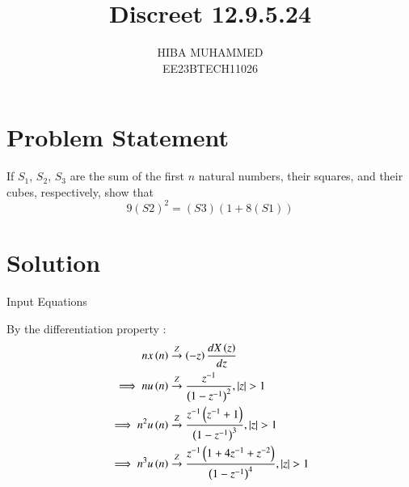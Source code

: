 \documentclass[journal,12pt,onecolumn]{IEEEtran}
\newcommand{\system}[1]{\stackrel{#1}{\rightarrow}}
\theoremstyle{remark}
\begin{document}
\let\vec\mathbf



\title{Discreet 12.9.5.24}
\author{HIBA MUHAMMED\\
        EE23BTECH11026}
\maketitle

\section*{Problem Statement}
If \(S_1\), \(S_2\), \(S_3\) are the sum of the first \(n\) natural numbers, their squares, and their cubes, respectively, show that 
\[ 9(S\scriptstyle 2)^2 = (S\scriptstyle 3)(1 + 8(S\scriptstyle 1)) \]

\section*{Solution}
\begin{table}[h]
  \centering
  
  \caption{Input Equations}
  \label{tab:input-equations}
  
\end{table}
 By the differentiation property :
    \begin{align}
     n x\brak{n} & \system{Z} \brak{-z} \frac{dX\brak{z}}{dz} \label{eq:11.9.5.26.1}\\
    \implies    n u\brak{n} & \system{Z} \frac{z^{-1}}{\brak{1-z^{-1}}^2} ,   \abs{z} >1 \label{eq:11.9.5.26.2}\\
    \implies     n^2 u\brak{n} & \system{Z} \frac{z^{-1}\brak{z^{-1}+1}}{\brak{1-z^{-1}}^3} ,  \abs{z} > 1\label{eq:11.9.5.26.3}\\
    \implies     n^3 u\brak{n} & \system{Z} \frac{z^{-1}\brak{1+4z^{-1}+z^{-2}}}{\brak{1-z^{-1}}^4} ,   \abs{z} >1\label{eq:11.9.5.26.4} \\
    \end{align}
    
\end{document}
